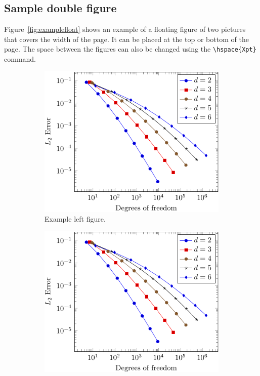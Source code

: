\documentclass[10pt,letter,twoside]{rmaa-rho-class/rmac-rho}
\begin{document}
    \subsection{Sample double figure}

        Figure~\ref{fig:examplefloat} shows an example of a floating figure of two pictures that covers the width of the page. It can be placed at the top or bottom of the page. The space between the figures can also be changed using the \verb|\hspace{Xpt}| command.

        \begin{figure}[ht] %
            \centering
                \begin{subfigure}[b]{0.38\linewidth} %
                    \includegraphics[width=0.95\linewidth]{figures/example2.pdf}
                    \caption{Example left figure.}
                    \label{fig:figa}
                \end{subfigure}
            \hspace{15pt}   %
                \begin{subfigure}[b]{0.38\linewidth} %
                    \centering
                    \includegraphics[width=0.95\linewidth]{figures/example2.pdf}

\end{subfigure}
\end{figure}
\end{document}
